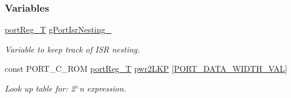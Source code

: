 \subsubsection*{Variables}
\begin{DoxyCompactItemize}
\item 
\hyperlink{group__template__cpu__intf_ga99980ab56ce9857e7380210d12e3d41f}{port\-Reg\-\_\-\-T} \hyperlink{group__template__cpu__intf_ga76dd98d1f19ff5ce4b4e880dfcedadb9}{g\-Port\-Isr\-Nesting\-\_\-}
\begin{DoxyCompactList}\small\item\em Variable to keep track of I\-S\-R nesting. \end{DoxyCompactList}\item 
const P\-O\-R\-T\-\_\-\-C\-\_\-\-R\-O\-M \hyperlink{group__template__cpu__intf_ga99980ab56ce9857e7380210d12e3d41f}{port\-Reg\-\_\-\-T} \hyperlink{group__template__cpu__intf_ga7c74d77135d5a694029ce4805f5dbc13}{pwr2\-L\-K\-P} \mbox{[}\hyperlink{group__template__cpu__intf_gac4d9e19c50315dec7721d4bc4d6b0605}{P\-O\-R\-T\-\_\-\-D\-A\-T\-A\-\_\-\-W\-I\-D\-T\-H\-\_\-\-V\-A\-L}\mbox{]}
\begin{DoxyCompactList}\small\item\em Look up table for\-: 2$^\wedge$n expression. \end{DoxyCompactList}\end{DoxyCompactItemize}
